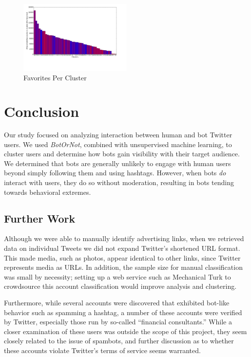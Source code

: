 \documentclass{sig-alternate-05-2015}
\begin{document}
\begin{figure}[h!]
	\caption{Favorites Per Cluster}
	\centering
		\includegraphics[width=0.5\textwidth]{imgs/favorites}
\end{figure}

\section{Conclusion}
Our study focused on analyzing interaction between human and bot Twitter users. We used \emph{BotOrNot}, combined with unsupervised machine learning, to cluster users and determine how bots gain visibility with their target audience. We determined that bots are generally unlikely to engage with human users beyond simply following them and using hashtags. However, when bots \emph{do} interact with users, they do so without moderation, resulting in bots tending towards behavioral extremes.

\subsection{Further Work}
Although we were able to manually identify advertising links, when we retrieved data on individual Tweets we did not expand Twitter's shortened URL format. This made media, such as photos, appear identical to other links, since Twitter represents media as URLs. In addition, the sample size for manual classification was small by necessity; setting up a web service such as Mechanical Turk to crowdsource this account classification would improve analysis and clustering.

Furthermore, while several accounts were discovered that exhibited bot-like behavior such as spamming a hashtag, a number of these accounts were verified by Twitter, especially those run by so-called ``financial consultants.'' While a closer examination of these users was outside the scope of this project, they seem closely related to the issue of spambots, and further discussion as to whether these accounts violate Twitter's terms of service seems warranted.
\end{document}
